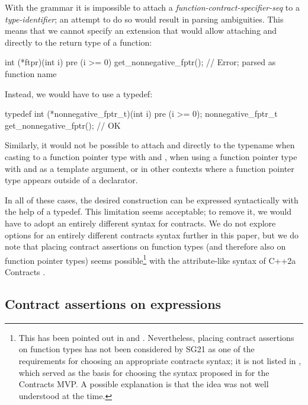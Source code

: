 With the \cite{P2900R9} grammar it is impossible to attach a \emph{function-contract-specifier-seq} to a \emph{type-identifier}; an attempt to do so would result in parsing ambiguities. This means that we cannot specify an extension that would allow attaching  and  directly to the return type of a function:
\begin{codeblock}
int (*ftpr)(int i) pre (i >= 0) get_nonnegative_fptr();  // Error;  parsed as function name
\end{codeblock}
Instead, we would have to use a typedef:
\begin{codeblock}
typedef int (*nonnegative_fptr_t)(int i) pre (i >= 0); 
nonnegative_fptr_t get_nonnegative_fptr();  // OK
\end{codeblock}
Similarly, it would not be possible to attach  and  directly to the typename when casting to a function pointer type with   and , when using a function pointer type with  and  as a template argument, or in other contexts where a function pointer type appears outside of a declarator.

In all of these cases, the desired construction can be expressed syntactically with the help of a typedef. This limitation seems acceptable; to remove it, we would have to adopt an entirely different syntax for contracts. We do not explore options for an entirely different contracts syntax further in this paper, but we do note that placing contract assertions on function types (and therefore also on function pointer types) seems possible\footnote{This has been pointed out in \cite{P2935R4} and \cite{P3028R0}. Nevertheless,  placing contract assertions on function types has not been considered by SG21 as one of the requirements for choosing an appropriate contracts syntax; it is not listed in \cite{P2885R3}, which served as the basis for choosing the syntax proposed in \cite{P2961R2} for the Contracts MVP. A possible explanation is that the idea was not well understood at the time.} with the attribute-like syntax of C++2a Contracts \cite{P0542R5}.


\subsection{Contract assertions on expressions}
\label{syntax_expr}


